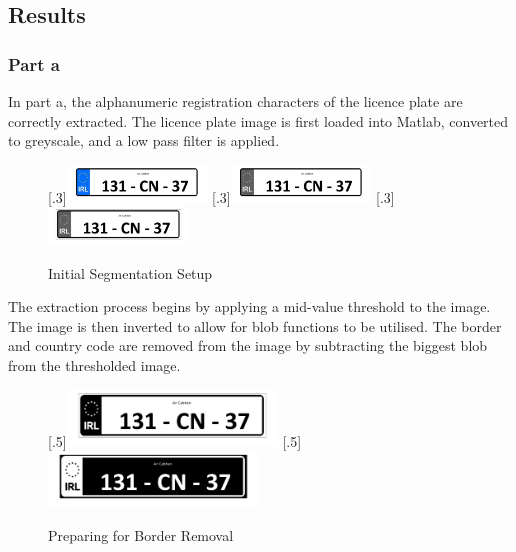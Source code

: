 \documentclass[a4paper]{article}
\begin{document}
	\subsection{Results}
	\subsubsection{Part a}
	In part a, the alphanumeric registration characters of the licence plate
	are correctly extracted. The licence plate image is first loaded into
	Matlab, converted to greyscale, and a low pass filter is applied.
	\begin{figure}[H]
		\centering
		[.3\linewidth]{\includegraphics[height=1cm]{Results/Q2/NumPlate1/qanumber_plate_1.jpg}}%
		[.3\linewidth]{\includegraphics[height=1cm]{Results/Q2/NumPlate1/qanumber_plate_1Grey.jpg}}%
		[.3\linewidth]{\includegraphics[height=1cm]{Results/Q2/NumPlate1/qanumber_plate_1Low.jpg}}%
		\caption{Initial Segmentation Setup}
		\label{fig:}
	\end{figure}
	\par The extraction process begins by applying a mid-value threshold to the
	image. The image is then inverted to allow for blob functions to be
	utilised. The border and country code are removed from the image by
	subtracting the biggest blob from the thresholded image.
	\begin{figure}[H]
		\centering
		[.5\linewidth]{\includegraphics[height=1.5cm]{Results/Q2/NumPlate1/qanumber_plate_1Mid.jpg}}%
		[.5\linewidth]{\includegraphics[height=1.5cm]{Results/Q2/NumPlate1/qanumber_plate_1Not.jpg}}%
		\caption{Preparing for Border Removal}
		\label{fig:}
	\end{figure}
\end{document}
